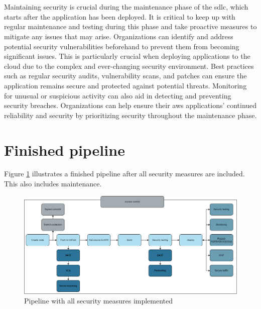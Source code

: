\\~\\
Maintaining security is crucial during the maintenance phase of the \acrshort{sdlc}, which starts after the application has been deployed. It is critical to keep up with regular maintenance and testing during this phase and take proactive measures to mitigate any issues that may arise. Organizations can identify and address potential security vulnerabilities beforehand to prevent them from becoming significant issues. This is particularly crucial when deploying applications to the cloud due to the complex and ever-changing security environment. 
\newpage
Best practices such as regular security audits, vulnerability scans, and patches can ensure the application remains secure and protected against potential threats. Monitoring for unusual or suspicious activity can also aid in detecting and preventing security breaches. Organizations can help ensure their \acrshort{aws} applications' continued reliability and security by prioritizing security throughout the maintenance phase.


\section{Finished pipeline}
Figure \ref{fig: Pipeline with all security measures implemented} illustrates a finished pipeline after all security measures are included. This also includes maintenance.  

\vspace{2mm}
\begin{figure}[H]
    \centering
    \includegraphics[width=0.8\columnwidth]{Images/FinalPipeline.png}
    \caption{Pipeline with all security measures implemented}
    \label{fig: Pipeline with all security measures implemented}
\end{figure}



